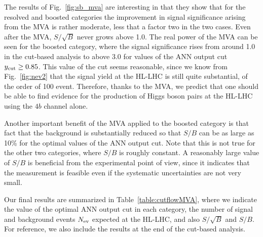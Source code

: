 The results of Fig.~\ref{fig:sb_mva} are interesting in that they show
that for the resolved and boosted categories the improvement in signal
significance arising from the MVA is rather moderate, less that a factor two
in the two cases.
%
Even after the MVA, $S/\sqrt{B}$ never grows above 1.0.
%
The real power of the MVA can be seen for the boosted category,
where the signal significance rises from around 1.0 in the cut-based
analysis to above 3.0 for values of the ANN output cut $y_{\rm cut}\ge0.85$.
%
This value of the cut seems reasonable, since we know from Fig.~\ref{fig:nev2}
that the signal yield at the HL-LHC is still quite substantial,
of the order of 100 event.
%
Therefore, thanks to the MVA, we predict that one should be able
to find evidence for the production of Higgs boson pairs
at the HL-LHC using the $4b$ channel alone.

Another important benefit of the MVA applied to the boosted
category is that fact that the background is substantially
reduced so that $S/B$ can be as large as 10\% for the optimal
values of the ANN output cut.
%
Note that this is not true for the other two categories,
where $S/B$ is roughly constant.
%
A reasonably large value of $S/B$ is beneficial
from the experimental point of view, since it indicates
that the measurement is feasible even if the
systematic uncertainties are not very small.

Our final results are summarized in Table~\ref{table:cutflowMVA}, where we indicate
the value of the optimal ANN output
cut in each category,
the number of signal and background events $N_{\rm ev}$ expected
at the HL-LHC,
and also $S/\sqrt{B}$ and $S/B$.
%
For reference, we also include the results at the end of
the cut-based
analysis.
%




